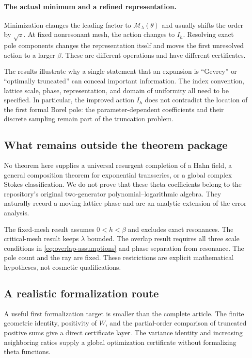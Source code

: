 \documentclass[11pt,a4paper]{article}
\numberwithin{equation}{section}
\theoremstyle{definition}\newtheorem{definition}[theorem]{Definition}
\theoremstyle{remark}\newtheorem{remark}[theorem]{Remark}
\newcommand{\calM}{\mathcal M}
\begin{document}
\paragraph{The actual minimum and a refined representation.}
Minimization changes the leading factor to $\calM_\lambda(\theta)$ and
usually shifts the order by $\sqrt z$. At fixed nonresonant mesh, the
action changes to $I_h$. Resolving exact pole components changes the
representation itself and moves the first unresolved action to a larger
$\beta$. These are different operations and have different certificates.

The results illustrate why a single statement that an expansion is
``Gevrey'' or ``optimally truncated'' can conceal important information.
The index convention, lattice scale, phase, representation, and domain of
uniformity all need to be specified. In particular, the improved action
$I_h$ does not contradict the location of the first formal Borel pole:
the parameter-dependent coefficients and their discrete sampling remain
part of the truncation problem.

\subsection{What remains outside the theorem package}
No theorem here supplies a universal resurgent completion of a Hahn field,
a general composition theorem for exponential transseries, or a global
complex Stokes classification. We do not prove that these theta
coefficients belong to the repository's original two-generator
polynomial--logarithmic algebra. They naturally record a moving lattice
phase and are an analytic extension of the error analysis.

The fixed-mesh result assumes $0<h<\beta$ and excludes exact resonances.
The critical-mesh result keeps $\lambda$ bounded. The overlap result
requires all three scale conditions in \eqref{eq:overlap-assumptions} and
phase separation from resonance. The pole count and the ray are fixed.
These restrictions are explicit mathematical hypotheses, not cosmetic
qualifications.

\subsection{A realistic formalization route}
A useful first formalization target is smaller than the complete article.
The finite geometric identity, positivity of $W$, and the partial-order
comparison of truncated positive sums give a direct certificate layer.
The variance identity and increasing neighboring ratios supply a global
optimization certificate without formalizing theta functions.
\end{document}
